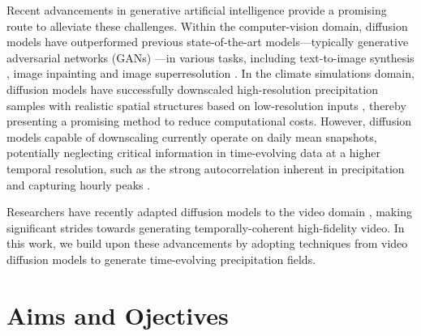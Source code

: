 \documentclass[ oneside,%
                    author={George Herbert},
                    degree={MSci},
                     title={Diffusion Models for Time-Evolving Precipitation Fields},
                  subtitle={}]{dissertation}
\begin{document}
Recent advancements in generative artificial intelligence provide a promising route to alleviate these challenges. Within the computer-vision domain, diffusion models \cite{Deep_Unsupervised_Learning_Sohl-Dickstein, DDPM_Ho, Score_Based_Song} have outperformed previous state-of-the-art models---typically generative adversarial networks (GANs) \cite{Goodfellow_Generative_Adversarial_Networks}---in various tasks, including text-to-image synthesis \cite{Ramesh_Zero-Shot_Text-to-Image_Generation,Rombach_High-Resolution_Image_Synthesis_with_Latent_Diffusion_Models,Imagen_Saharia}, image inpainting \cite{Score_Based_Song,Lugamyr_RePaint} and image superresolution \cite{Saharia_Image_Super-Resolution_via_Iterative_Refinement,Cascaded_Ho}. In the climate simulations domain, diffusion models have successfully downscaled high-resolution precipitation samples with realistic spatial structures based on low-resolution inputs \cite{Addison_Machine_Learning_Emulation}, thereby presenting a promising method to reduce computational costs. However, diffusion models capable of downscaling currently operate on daily mean snapshots, potentially neglecting critical information in time-evolving data at a higher temporal resolution, such as the strong autocorrelation inherent in precipitation and capturing hourly peaks \cite{MO_RCP_Guidance}.

Researchers have recently adapted diffusion models to the video domain \cite{VDM_Ho, Imagen_Video_Ho}, making significant strides towards generating temporally-coherent high-fidelity video. In this work, we build upon these advancements by adopting techniques from video diffusion models to generate time-evolving precipitation fields.

\section{Aims and Ojectives}
\end{document}
